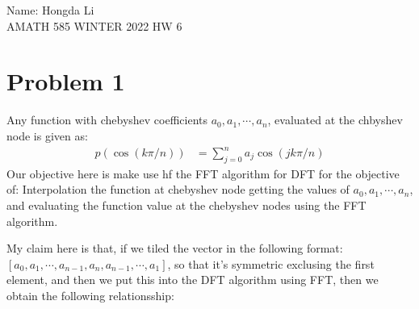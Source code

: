 \documentclass[]{article}
\begin{document}
\begin{center}
    Name: Hongda Li
    \\
    AMATH 585 WINTER 2022 HW 6
\end{center}
\section*{Problem 1}
    Any function with chebyshev coefficients $a_0, a_1, \cdots, a_n$, evaluated at the chbyshev node is given as: 
    \begin{align*}\tag{1}\label{eqn:1}
        p(\cos(k\pi/n)) &= 
        \sum_{j = 0}^{n}a_j\cos(jk\pi/n)
    \end{align*}
    Our objective here is make use hf the FFT algorithm for DFT for the objective of: Interpolation the function at chebyshev node getting the values of $a_0, a_1, \cdots, a_n$, and evaluating the function value at the chebyshev nodes using the FFT algorithm. 
    \par
    My claim here is that, if we tiled the vector in the following format: $[a_0, a_1, \cdots, a_{n - 1}, a_n, a_{n - 1}, \cdots, a_1]$, so that it's symmetric exclusing the first element, and then we put this into the DFT algorithm using FFT, then we obtain the following relationsship: 
    
\end{document}
